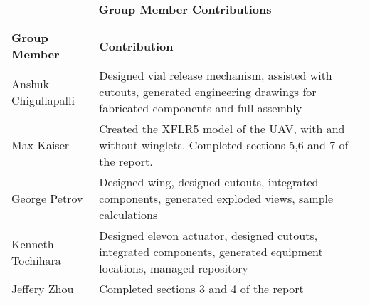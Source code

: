 \begin{enumerate}[wide,label=\textbf{\arabic*}., labelindent=0pt]
    \begin{table}[H]
        \begin{center} 
        \caption{\textbf{Group Member Contributions}}
        \begin{tabular}{ | p{2in} | p{4in}| } 
            \hline
            \textbf{Group Member} & \textbf{Contribution} \\  \hline
            Anshuk Chigullapalli & Designed vial release mechanism, assisted with cutouts, generated engineering drawings for fabricated components and full assembly\\ \hline
            Max Kaiser & Created the XFLR5 model of the UAV, with and without winglets. Completed sections 5,6 and 7 of the report. \\ \hline
            George Petrov & Designed wing, designed cutouts, integrated components, generated exploded views, sample calculations \\ \hline
            Kenneth Tochihara & Designed elevon actuator, designed cutouts, integrated components, generated equipment locations, managed repository \\ \hline
            Jeffery Zhou & Completed sections 3 and 4 of the report\\ \hline
        \end{tabular}
        \end{center}
    \end{table}
    
\end{enumerate}